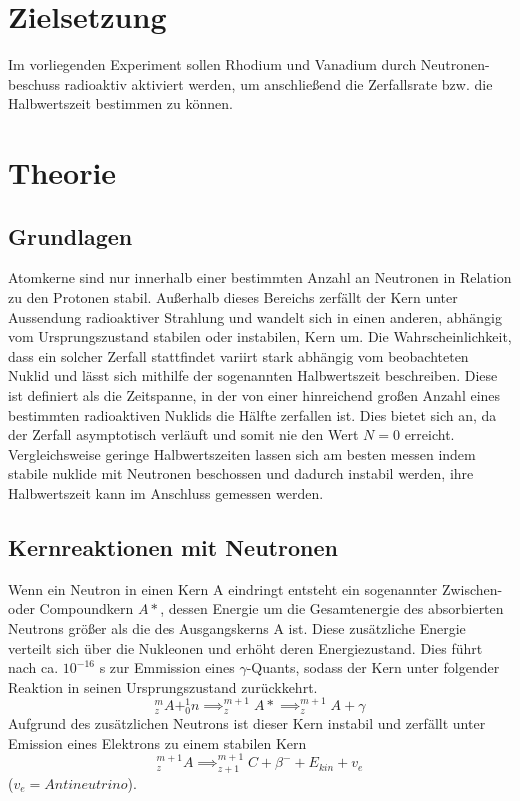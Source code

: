 \section{Zielsetzung}
\label{sec:zielsetzung}
Im vorliegenden Experiment sollen Rhodium und Vanadium durch Neutronen-beschuss radioaktiv aktiviert werden, um anschließend 
die Zerfallsrate bzw. die Halbwertszeit bestimmen zu können.
\section{Theorie}
\label{sec:theorie}
\subsection{Grundlagen}
Atomkerne sind nur innerhalb einer bestimmten Anzahl an Neutronen in Relation zu den Protonen stabil. 
Außerhalb dieses Bereichs zerfällt der Kern unter Aussendung radioaktiver Strahlung und wandelt sich in 
einen anderen, abhängig vom Ursprungszustand stabilen oder instabilen, Kern um. Die Wahrscheinlichkeit, 
dass ein solcher Zerfall stattfindet variirt stark abhängig vom beobachteten Nuklid und lässt sich mithilfe 
der sogenannten Halbwertszeit beschreiben. Diese ist definiert als die Zeitspanne, in der von einer 
hinreichend großen Anzahl eines bestimmten radioaktiven Nuklids die Hälfte zerfallen ist. Dies bietet 
sich an, da der Zerfall asymptotisch verläuft und somit nie den Wert $N=0$ erreicht. Vergleichsweise 
geringe Halbwertszeiten lassen sich am besten messen indem stabile nuklide mit Neutronen beschossen und 
dadurch instabil werden, ihre Halbwertszeit kann im Anschluss gemessen werden.
\subsection{Kernreaktionen mit Neutronen}
Wenn ein Neutron in einen Kern A eindringt entsteht ein sogenannter Zwischen- oder Compoundkern $A*$, dessen 
Energie um die Gesamtenergie des absorbierten Neutrons größer als die des Ausgangskerns A ist.  Diese 
zusätzliche Energie verteilt sich über die Nukleonen und erhöht deren Energiezustand. Dies führt nach ca. 
$10^{-16}$ s zur Emmission eines $\gamma$-Quants, sodass der Kern unter folgender Reaktion in seinen 
Ursprungszustand zurückkehrt.
\begin{equation*}
^m_zA + ^1_0n \implies ^{m+1}_zA* \implies ^{m+1}_z A+ \gamma
\end{equation*}
Aufgrund des zusätzlichen Neutrons ist dieser Kern instabil und zerfällt unter Emission eines 
Elektrons zu einem stabilen Kern
\begin{equation*}
^{m+1}_z A \implies  ^{m+1}_{z+1} C + \beta^- + E_{kin} + v_e
\end{equation*}
($v_e = Antineutrino$).
